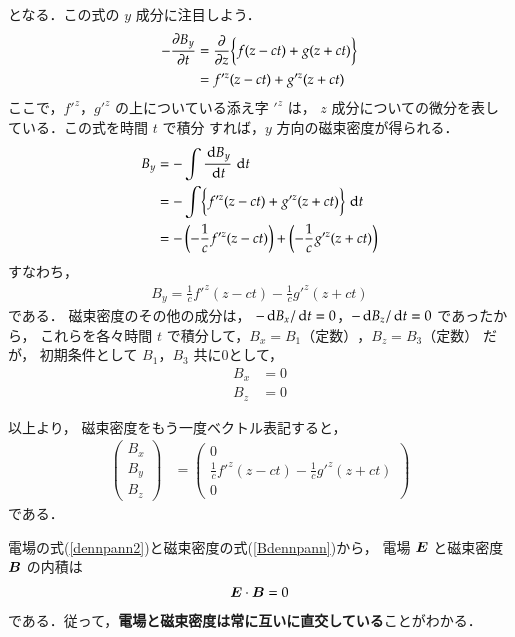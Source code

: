         となる．この式の $y$ 成分に注目しよう．
        \begin{align*}
            -\frac{\partial B_{y}}{\partial t}
            &=\frac{\partial }{\partial z}\biggl\{f(z-ct) +g(z+ct)\biggr\} \\
            &=f'^{z}(z-ct)+g'^{z}(z+ct)
        \end{align*}
        ここで，$f'^{z}$，$g'^{z}$ の上についている添え字 $'^{z}$ は，
        $z$ 成分についての微分を表している．この式を時間 $t$ で積分
        すれば，$y$ 方向の磁束密度が得られる．
        \begin{align*}
        B_{y}&=-\int\frac{\,\mathrm{d} B_{y}}{\,\mathrm{d} t}\,\,\mathrm{d} t \\
             &=-\int\biggl\{f'^{z}(z-ct)+g'^{z}(z+ct)\biggr\}\,\,\mathrm{d} t \notag \\
             &=-\left(-\frac{1}{c}f'^{z}(z-ct)\right)+\left(-\frac{1}{c}g'^{z}(z+ct)\right)
        \end{align*}
        すなわち，
        \begin{align}
        B_{y}=\frac{1}{c}f'^{z}(z-ct)-\frac{1}{c}g'^{z}(z+ct)
        \end{align}
        である．
        磁束密度のその他の成分は，
        $-\,\mathrm{d} B_{x}/\,\mathrm{d} t=0$，$-\,\mathrm{d} B_{z}/\,\mathrm{d} t=0$ であったから，
        これらを各々時間 $t$ で積分して，$B_{x}=B_{1}\mbox{（定数）}$，$B_{z}=B_{3}\mbox{（定数）}$ だが，
        初期条件として $B_{1}$，$B_{3}$ 共に0として，
        \begin{align}
        B_{x}&=0\\
        B_{z}&=0
        \end{align}

        以上より，
        磁束密度をもう一度ベクトル表記すると，
        \begin{align}\label{Bdennpann}
        \left(
        \begin{array}{cc}
        B_{x}\\
        B_{y}\\
        B_{z}
        \end{array}
        \right)
        &=
        \left(
        \begin{array}{cc}
        0\\
        \displaystyle\frac{1}{c}f'^{z}(z-ct)-\displaystyle\frac{1}{c}g'^{z}(z+ct)\\
        0
        \end{array}
        \right)
        \end{align}
        である．

        電場の式(\ref{dennpann2})と磁束密度の式(\ref{Bdennpann})から，
        電場 $\boldsymbol{E}$ と磁束密度 $\boldsymbol{B}$ の内積は
        \begin{align}
            \boldsymbol{E} \cdot \boldsymbol{B} =0
        \end{align}
        である．従って，\textbf{電場と磁束密度は常に互いに直交している}ことがわかる．\\



